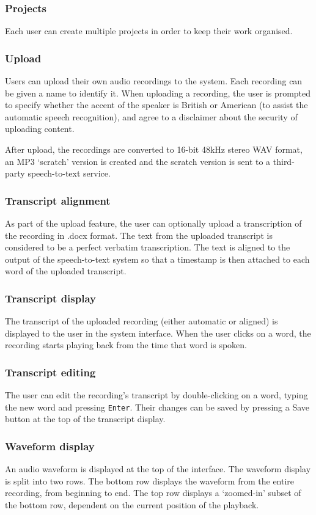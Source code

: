 \subsubsection{Projects}
Each user can create multiple projects in order to keep their work organised.

\subsubsection{Upload}
Users can upload their own audio recordings to the system.  Each recording can
be given a name to identify it. When uploading a recording, the user is
prompted to specify whether the accent of the speaker is British or American
(to assist the automatic speech recognition), and agree to a disclaimer about
the security of uploading content.

After upload, the recordings are converted to 16-bit 48kHz stereo WAV format,
an MP3 `scratch' version is created and the scratch version is sent to a
third-party speech-to-text service.

\subsubsection{Transcript alignment}
As part of the upload feature, the user can optionally upload a transcription
of the recording in .docx format. The text from the uploaded transcript is
considered to be a perfect verbatim transcription. The text is aligned to the
output of the speech-to-text system so that a timestamp is then attached to
each word of the uploaded transcript.

\subsubsection{Transcript display}
The transcript of the uploaded recording (either automatic or aligned) is
displayed to the user in the system interface. When the user clicks on a word,
the recording starts playing back from the time that word is spoken.

\subsubsection{Transcript editing}
The user can edit the recording's transcript by double-clicking on a word,
typing the new word and pressing \texttt{Enter}. Their changes can be saved by
pressing a Save button at the top of the transcript display.

\subsubsection{Waveform display}
An audio waveform is displayed at the top of the interface. The waveform
display is split into two rows. The bottom row displays the waveform from the
entire recording, from beginning to end. The top row displays a `zoomed-in'
subset of the bottom row, dependent on the current position of the playback.

